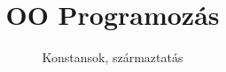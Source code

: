 \documentclass[usenames,dvipsnames,aspectratio=169]{beamer}
\title[OO Programozás - C++]{OO Programozás}
\subtitle{Konstansok, származtatás}
\begin{document}
\begin{frame}[plain]
  \titlepage
  \logoalul
\end{frame}



\end{document}
